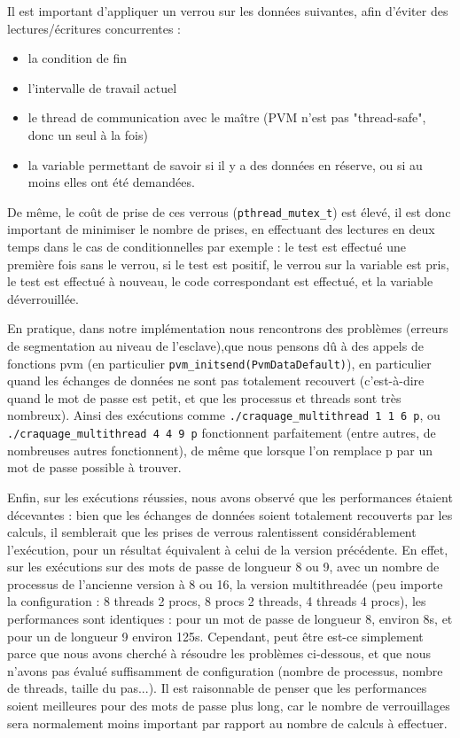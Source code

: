\documentclass[a4paper,11pt]{article}
\begin{document}
Il est important d'appliquer un verrou sur les données suivantes, afin d'éviter des lectures/écritures concurrentes :
\begin{itemize}
\item la condition de fin 
\item l'intervalle de travail actuel
\item le thread de communication avec le maître (PVM n'est pas "thread-safe", donc un seul à la fois)
\item la variable permettant de savoir si il y a des données en réserve, ou si au moins elles ont été demandées.
\end{itemize}

De même, le coût de prise de ces verrous (\texttt{pthread\_mutex\_t}) est élevé, il est donc important de minimiser le nombre de prises, en effectuant des lectures en deux temps dans le cas de conditionnelles par exemple :
le test est effectué une première fois sans le verrou, si le test est positif, le verrou sur la variable est pris, le test est effectué à nouveau, le code correspondant est effectué, et la variable déverrouillée.


En pratique, dans notre implémentation nous rencontrons des problèmes (erreurs de segmentation au niveau de l'esclave),que nous pensons dû à des appels de fonctions pvm (en particulier \texttt{pvm\_initsend(PvmDataDefault)}), en particulier quand les échanges de données ne sont pas totalement recouvert (c'est-à-dire quand le mot de passe est petit, et que les processus et threads sont très nombreux).
Ainsi des exécutions comme \texttt{./craquage\_multithread 1 1 6 p}, ou \texttt{./craquage\_multithread 4 4 9 p} fonctionnent parfaitement (entre autres, de nombreuses autres fonctionnent), de même que lorsque l'on remplace p par un mot de passe possible à trouver.


Enfin, sur les exécutions réussies, nous avons observé que les performances étaient décevantes : bien que les échanges de données soient totalement recouverts par les calculs, il semblerait que les prises de verrous ralentissent considérablement l'exécution, pour un résultat équivalent à celui de la version précédente.
En effet, sur les exécutions sur des mots de passe de longueur 8 ou 9, avec un nombre de processus de l'ancienne version à 8 ou 16, la version multithreadée (peu importe la configuration : 8 threads 2 procs, 8 procs 2 threads, 4 threads 4 procs), les performances sont identiques : pour un mot de passe de longueur 8, environ 8s, et pour un de longueur 9 environ 125s. 
Cependant, peut être est-ce simplement parce que nous avons cherché à résoudre les problèmes ci-dessous, et que nous n'avons pas évalué suffisamment de configuration (nombre de processus, nombre de threads, taille du pas...).
Il est raisonnable de penser que les performances soient meilleures pour des mots de passe plus long, car le nombre de verrouillages sera normalement moins important par rapport au nombre de calculs à effectuer.
\end{document}
